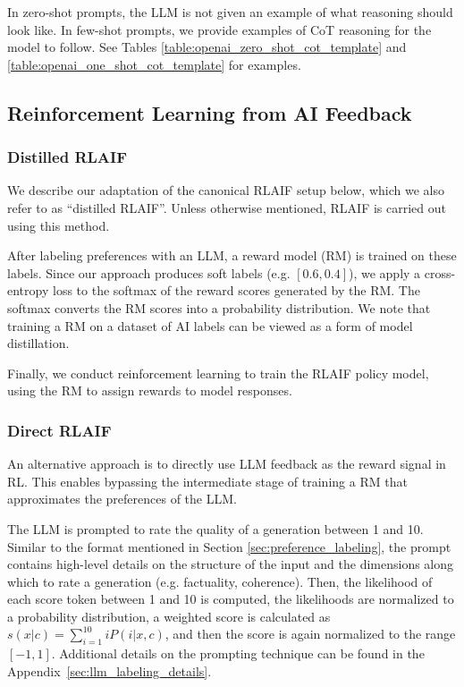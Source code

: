 \documentclass[11pt]{article}
\begin{document}
In zero-shot prompts, the LLM is not given an example of what reasoning should look like. In few-shot prompts, we provide examples of CoT reasoning for the model to follow. See Tables \ref{table:openai_zero_shot_cot_template} and \ref{table:openai_one_shot_cot_template} for examples.


\subsection{Reinforcement Learning from AI Feedback}

\subsubsection{Distilled RLAIF}

We describe our adaptation of the canonical RLAIF setup below, which we also refer to as ``distilled RLAIF''. Unless otherwise mentioned, RLAIF is carried out using this method.

After labeling preferences with an LLM, a reward model (RM) is trained on these labels. Since our approach produces soft labels (e.g. $[0.6, 0.4]$), we apply a cross-entropy loss to the softmax of the reward scores generated by the RM. The softmax converts the RM scores into a probability distribution. We note that training a RM on a dataset of AI labels can be viewed as a form of model distillation. 

Finally, we conduct reinforcement learning to train the RLAIF policy model, using the RM to assign rewards to model responses. 

\subsubsection{Direct RLAIF}
\label{sec:direct_scoring}

An alternative approach is to directly use LLM feedback as the reward signal in RL. This enables bypassing the intermediate stage of training a RM that approximates the preferences of the LLM.

The LLM is prompted to rate the quality of a generation between 1 and 10. Similar to the format mentioned in Section \ref{sec:preference_labeling}, the prompt contains high-level details on the structure of the input and the dimensions along which to rate a generation (e.g. factuality, coherence). Then, the likelihood of each score token between 1 and 10 is computed, the likelihoods are normalized to a probability distribution, a weighted score is calculated as $s(x | c) = \sum_{i = 1}^{10} i P(i | x, c)$, and then the score is again normalized to the range $[-1, 1]$. Additional details on the prompting technique can be found in the Appendix~\ref{sec:llm_labeling_details}.
\end{document}
